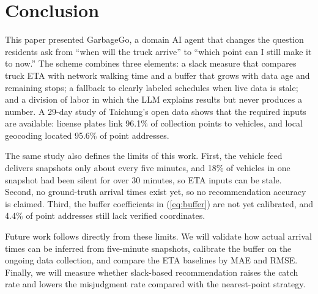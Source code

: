 \section{Conclusion}\label{sec:conclusion}
This paper presented GarbageGo, a domain AI agent that changes the
question residents ask from ``when will the truck arrive'' to ``which
point can I still make it to now.'' The scheme combines three elements:
a slack measure that compares truck ETA with network walking time and a
buffer that grows with data age and remaining stops; a fallback to
clearly labeled schedules when live data is stale; and a division of
labor in which the LLM explains results but never produces a number.
A 29-day study of Taichung's open data shows that the required inputs
are available: license plates link 96.1\% of collection points to
vehicles, and local geocoding located 95.6\% of point addresses.

The same study also defines the limits of this work. First, the vehicle
feed delivers snapshots only about every five minutes, and 18\% of
vehicles in one snapshot had been silent for over 30 minutes, so ETA
inputs can be stale. Second, no ground-truth arrival times exist yet, so
no recommendation accuracy is claimed. Third, the buffer coefficients in
(\ref{eq:buffer}) are not yet calibrated, and 4.4\% of point addresses
still lack verified coordinates.

Future work follows directly from these limits. We will validate how
actual arrival times can be inferred from five-minute snapshots,
calibrate the buffer on the ongoing data collection, and compare the ETA
baselines by MAE and RMSE. Finally, we will measure whether slack-based
recommendation raises the catch rate and lowers the misjudgment rate
compared with the nearest-point strategy.
